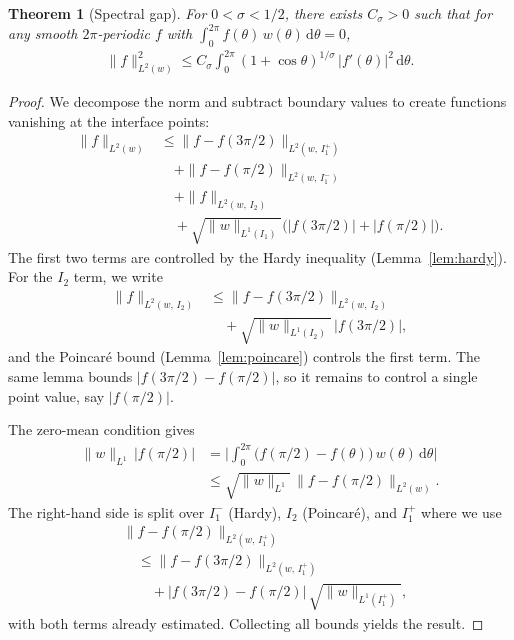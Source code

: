 \documentclass[a4paper, 11pt]{article}
\newtheorem{theorem}{Theorem}
\begin{document}
\begin{theorem}[Spectral gap]\label{thm:gap}
For $0 < \sigma < 1/2$, there exists $C_\sigma > 0$ such that for any smooth $2\pi$-periodic $f$ with $\int_0^{2\pi} f(\theta)\, w(\theta)\, \mathrm{d}\theta = 0$,
\begin{align}
    \|f\|_{L^2(w)}^2 \leq C_\sigma \int_0^{2\pi} (1+\cos\theta)^{1/\sigma}\, |f'(\theta)|^2\, \mathrm{d}\theta.
\end{align}
\end{theorem}

\begin{proof}
We decompose the norm and subtract boundary values to create functions vanishing at the interface points:
\begin{align}
    \|f\|_{L^2(w)} &\leq \|f - f(3\pi/2)\|_{L^2(w,\,I_1^+)} \nonumber\\
    &\quad + \|f - f(\pi/2)\|_{L^2(w,\,I_1^-)} \nonumber\\
    &\quad + \|f\|_{L^2(w,\,I_2)} \nonumber\\
    &\quad + \sqrt{\|w\|_{L^1(I_1)}}\big(|f(3\pi/2)| + |f(\pi/2)|\big).
\end{align}
The first two terms are controlled by the Hardy inequality (Lemma~\ref{lem:hardy}). For the $I_2$ term, we write
\begin{align}
    \|f\|_{L^2(w,\,I_2)} &\leq \|f - f(3\pi/2)\|_{L^2(w,\,I_2)} \nonumber\\
    &\quad + \sqrt{\|w\|_{L^1(I_2)}}\,|f(3\pi/2)|,
\end{align}
and the Poincar\'{e} bound (Lemma~\ref{lem:poincare}) controls the first term. The same lemma bounds $|f(3\pi/2) - f(\pi/2)|$, so it remains to control a single point value, say $|f(\pi/2)|$.

The zero-mean condition gives
\begin{align}
    \|w\|_{L^1}\,|f(\pi/2)| &= \Big|\int_0^{2\pi}\big(f(\pi/2) - f(\theta)\big)\, w(\theta)\, \mathrm{d}\theta\Big| \nonumber\\
    &\leq \sqrt{\|w\|_{L^1}}\,\|f - f(\pi/2)\|_{L^2(w)}.
\end{align}
The right-hand side is split over $I_1^-$ (Hardy), $I_2$ (Poincar\'{e}), and $I_1^+$ where we use
\begin{align}
    &\|f - f(\pi/2)\|_{L^2(w,\,I_1^+)} \nonumber\\
    &\quad \leq \|f - f(3\pi/2)\|_{L^2(w,\,I_1^+)} \nonumber\\
    &\quad\quad + |f(3\pi/2) - f(\pi/2)|\,\sqrt{\|w\|_{L^1(I_1^+)}},
\end{align}
with both terms already estimated. Collecting all bounds yields the result.
\end{proof}
\end{document}
